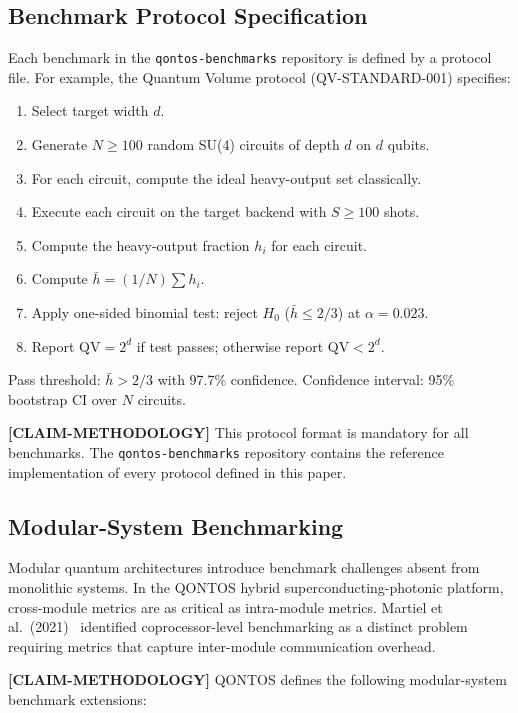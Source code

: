 \documentclass[conference]{IEEEtran}
\begin{document}
\subsection{Benchmark Protocol Specification}

Each benchmark in the \texttt{qontos-benchmarks} repository is defined by a protocol file. For example, the Quantum Volume protocol (QV-STANDARD-001) specifies:

\begin{enumerate}[leftmargin=*]
\item Select target width $d$.
\item Generate $N \geq 100$ random SU(4) circuits of depth $d$ on $d$ qubits.
\item For each circuit, compute the ideal heavy-output set classically.
\item Execute each circuit on the target backend with $S \geq 100$ shots.
\item Compute the heavy-output fraction $h_i$ for each circuit.
\item Compute $\bar{h} = (1/N) \sum h_i$.
\item Apply one-sided binomial test: reject $H_0$ ($\bar{h} \leq 2/3$) at $\alpha = 0.023$.
\item Report $\mathrm{QV} = 2^d$ if test passes; otherwise report $\mathrm{QV} < 2^d$.
\end{enumerate}

Pass threshold: $\bar{h} > 2/3$ with 97.7\% confidence. Confidence interval: 95\% bootstrap CI over $N$ circuits.

\textbf{[CLAIM-METHODOLOGY]} This protocol format is mandatory for all benchmarks. The \texttt{qontos-benchmarks} repository contains the reference implementation of every protocol defined in this paper.

\subsection{Modular-System Benchmarking}

Modular quantum architectures introduce benchmark challenges absent from monolithic systems. In the QONTOS hybrid superconducting-photonic platform, cross-module metrics are as critical as intra-module metrics. Martiel et al.\ (2021)~\cite{martiel2021} identified coprocessor-level benchmarking as a distinct problem requiring metrics that capture inter-module communication overhead.

\textbf{[CLAIM-METHODOLOGY]} QONTOS defines the following modular-system benchmark extensions:
\end{document}
